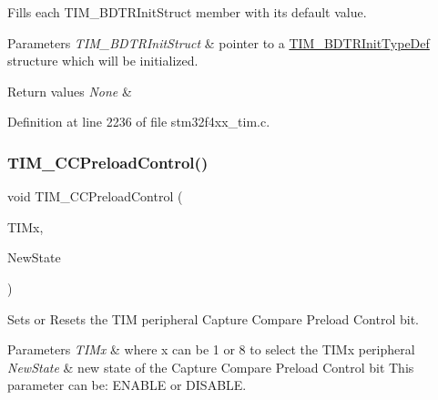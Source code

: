 Fills each T\+I\+M\+\_\+\+B\+D\+T\+R\+Init\+Struct member with its default value. 


\begin{DoxyParams}{Parameters}
{\em T\+I\+M\+\_\+\+B\+D\+T\+R\+Init\+Struct} & pointer to a \hyperlink{struct_t_i_m___b_d_t_r_init_type_def}{T\+I\+M\+\_\+\+B\+D\+T\+R\+Init\+Type\+Def} structure which will be initialized. \\
\hline
\end{DoxyParams}

\begin{DoxyRetVals}{Return values}
{\em None} & \\
\hline
\end{DoxyRetVals}


Definition at line 2236 of file stm32f4xx\+\_\+tim.\+c.

\mbox{\label{group___t_i_m___group4_ga0a935254e44312b1d78e8684a58db3c1}} 
\subsubsection{\texorpdfstring{T\+I\+M\+\_\+\+C\+C\+Preload\+Control()}{TIM\_CCPreloadControl()}}
{\footnotesize\ttfamily void T\+I\+M\+\_\+\+C\+C\+Preload\+Control (\begin{DoxyParamCaption}\item[{\hyperlink{struct_t_i_m___type_def}{T\+I\+M\+\_\+\+Type\+Def} $\ast$}]{T\+I\+Mx,  }\item[{Functional\+State}]{New\+State }\end{DoxyParamCaption})}



Sets or Resets the T\+IM peripheral Capture Compare Preload Control bit. 


\begin{DoxyParams}{Parameters}
{\em T\+I\+Mx} & where x can be 1 or 8 to select the T\+I\+Mx peripheral \\
\hline
{\em New\+State} & new state of the Capture Compare Preload Control bit This parameter can be\+: E\+N\+A\+B\+LE or D\+I\+S\+A\+B\+LE. \\
\hline
\end{DoxyParams}

